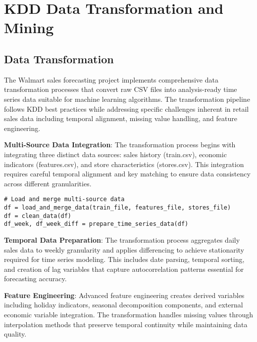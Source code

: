 %
%
%

\chapter{KDD Data Transformation and Mining}

\section{Data Transformation}

The Walmart sales forecasting project implements comprehensive data transformation processes that convert raw CSV files into analysis-ready time series data suitable for machine learning algorithms. The transformation pipeline follows KDD best practices while addressing specific challenges inherent in retail sales data including temporal alignment, missing value handling, and feature engineering.

\textbf{Multi-Source Data Integration}: The transformation process begins with integrating three distinct data sources: sales history (train.csv), economic indicators (features.csv), and store characteristics (stores.csv). This integration requires careful temporal alignment and key matching to ensure data consistency across different granularities.

\begin{lstlisting}[style=bashstyle, caption={Data Integration and Preprocessing Pipeline}]
# Load and merge multi-source data
df = load_and_merge_data(train_file, features_file, stores_file)
df = clean_data(df)
df_week, df_week_diff = prepare_time_series_data(df)
\end{lstlisting}

\textbf{Temporal Data Preparation}: The transformation process aggregates daily sales data to weekly granularity and applies differencing to achieve stationarity required for time series modeling. This includes date parsing, temporal sorting, and creation of lag variables that capture autocorrelation patterns essential for forecasting accuracy.

\textbf{Feature Engineering}: Advanced feature engineering creates derived variables including holiday indicators, seasonal decomposition components, and external economic variable integration. The transformation handles missing values through interpolation methods that preserve temporal continuity while maintaining data quality.

